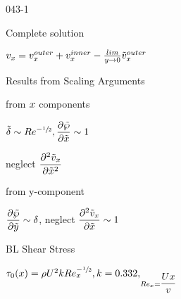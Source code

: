 \begin{mitframe}{043-1}
\begin{listone}
\begin{listtwo}
        \end{listtwo}
\item Complete solution
        \begin{listtwo}
        		\item $\vvel_{\disp}=\vvel_{\disp}^{outer}+\vvel_{\disp}^{inner}-\frac{lim}{y\rightarrow{0}}\tilde{\vvel}_{\disp}^{outer}$
        \end{listtwo}
\item Results from Scaling Arguments
		\begin{listtwo}
        		\item from $\disp$ components
        			\begin{listthree}
           				 \item$\tilde{\blthick}\sim\reynolds^{-\sfrac{1}{2}}, \dfrac{\partial\tilde{\dynpress}}{\partial\tilde{\disp}}\sim{1}$
             			   \item neglect $\dfrac{\partial^2\tilde{\vvel}_{\disp}}{\partial\tilde{\disp}^2}
                $
        			\end{listthree}
       \item from y-component  
       				\begin{listthree}
                    		\item $\dfrac{\partial\tilde{\dynpress}}{\partial\tilde{y}}\sim\blthick$, neglect $\dfrac{\partial^2\tilde{\vvel}_{\disp}}{\partial\tilde{\disp}}\sim{1}$
                            
                    \end{listthree}
        \end{listtwo}
\item BL Shear Stress
\item $\torque_0(\disp)=\dens\uvel^2\thermcond\reynolds_{\disp}^{-\sfrac{1}{2}},\thermcond=0.332,_{\reynolds_{\disp}=\dfrac{\uvel\disp}{\vvel}}$
\end{listone}
\end{mitframe}